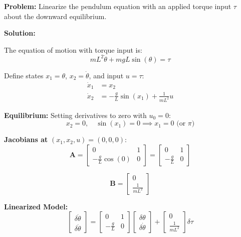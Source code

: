 \begin{examplebox}
\textbf{Problem:} Linearize the pendulum equation with an applied torque input $\tau$ about the downward equilibrium.

\textbf{Solution:}

The equation of motion with torque input is:
\begin{equation}
mL^2\ddot{\theta} + mgL\sin(\theta) = \tau
\end{equation}

Define states $x_1 = \theta$, $x_2 = \dot{\theta}$, and input $u = \tau$:
\begin{align}
\dot{x}_1 &= x_2 \\
\dot{x}_2 &= -\frac{g}{L}\sin(x_1) + \frac{1}{mL^2}u
\end{align}

\textbf{Equilibrium:} Setting derivatives to zero with $u_0 = 0$:
\begin{equation}
x_2 = 0, \quad \sin(x_1) = 0 \implies x_1 = 0 \text{ (or } \pi\text{)}
\end{equation}

\textbf{Jacobians at} $(x_1, x_2, u) = (0, 0, 0)$:
\begin{equation}
\mathbf{A} = \begin{bmatrix} 0 & 1 \\ -\frac{g}{L}\cos(0) & 0 \end{bmatrix} = \begin{bmatrix} 0 & 1 \\ -\frac{g}{L} & 0 \end{bmatrix}
\end{equation}

\begin{equation}
\mathbf{B} = \begin{bmatrix} 0 \\ \frac{1}{mL^2} \end{bmatrix}
\end{equation}

\textbf{Linearized Model:}
\begin{equation}
\begin{bmatrix} \delta\dot{\theta} \\ \delta\ddot{\theta} \end{bmatrix} = \begin{bmatrix} 0 & 1 \\ -\frac{g}{L} & 0 \end{bmatrix} \begin{bmatrix} \delta\theta \\ \delta\dot{\theta} \end{bmatrix} + \begin{bmatrix} 0 \\ \frac{1}{mL^2} \end{bmatrix} \delta\tau
\end{equation}


\end{examplebox}
